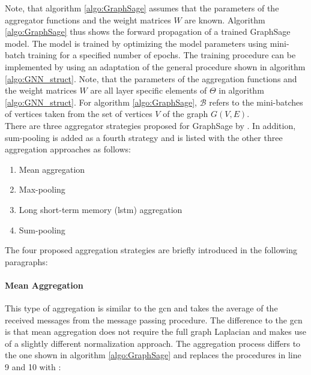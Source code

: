 	\noindent Note, that algorithm \ref{algo:GraphSage} assumes that the
	parameters of the aggregator functions and the weight matrices $W$
	are known. Algorithm \ref{algo:GraphSage} thus shows the forward
	propagation of a trained GraphSage model. The model is trained by
	optimizing the model parameters using mini-batch training for a specified 
	number of epochs. The training procedure can be implemented by using an
	adaptation of the general procedure shown in algorithm \ref{algo:GNN_struct}. 
	Note, that the parameters of the aggregation functions and the weight 
	matrices $W$ are all layer specific elements of $\Theta$ in algorithm 
	\ref{algo:GNN_struct}. For algorithm \ref{algo:GraphSage}, $\mathcal{B}$ 
	refers to the mini-batches of vertices taken from the set of vertices $V$ 
	of the graph $G(V,E)$. \\

	\noindent There are three aggregator strategies proposed for GraphSage by
	\citeauthor{hamilton2017inductive} \citeyearpar[p.
	5-6]{hamilton2017inductive}. In addition, sum-pooling is added as a
	fourth strategy and is listed with the other three aggregation approaches as
	follows:

	\begin{enumerate}
		\setlength\itemsep{0.2em}
		\item Mean aggregation
		\item Max-pooling
		\item Long short-term memory (\acs{lstm}) aggregation
		\item Sum-pooling
	\end{enumerate}

	\noindent The four proposed aggregation strategies are briefly introduced
	in the following paragraphs:

	\paragraph{Mean Aggregation} \mbox{}

	\noindent This type of aggregation is similar to the \acs{gcn} and takes the
	average of the received messages from the message passing procedure. The 
	difference to the \acs{gcn} is that mean aggregation does not require the full 
	graph Laplacian and makes use of a slightly different normalization approach. 
	The aggregation process differs to the one shown in algorithm 
	\ref{algo:GraphSage} and replaces the procedures in line 9 and 10 with 
	\citep[p. 5]{hamilton2017inductive}:

